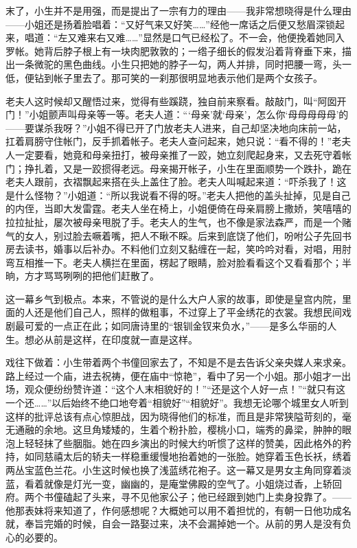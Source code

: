 \par 末了，小生并不是用强，而是提出了一宗有力的理由——我非常想晓得是什么理由——小姐还是扬着脸唱着：“又好气来又好笑……”经他一席话之后便又愁眉深锁起来，唱道：“左又难来右又难……”显然是口气已经松了。不一会，他便挽着她同入罗帐。她背后脖子根上有一块肉肥敦敦的；一绺子细长的假发沿着背脊垂下来，描出一条微驼的黑色曲线。小生只把她的脖子一勾，两人并排，同时把腰一弯，头一低，便钻到帐子里去了。那可笑的一刹那很明显地表示他们是两个女孩子。
\par 老夫人这时候却又醒悟过来，觉得有些蹊跷，独自前来察看。敲敲门，叫“阿囡开门！”小姐颤声叫母亲等一等。老夫人道：“‘母亲’就‘母亲’，怎么你‘母母母母母’的——要谋杀我呀？”小姐不得已开了门放老夫人进来，自己却坚决地向床前一站，扛着肩膀守住帐门，反手抓着帐子。老夫人查问起来，她只说：“看不得的！”老夫人一定要看，她竟和母亲扭打，被母亲推了一跤，她立刻爬起身来，又去死守着帐门；挣扎着，又是一跤掼得老远。母亲揭开帐子，小生在里面顺势一个跌扑，跪在老夫人跟前，衣褶飘起来搭在头上盖住了脸。老夫人叫喊起来道：“吓杀我了！这是什么怪物？”小姐道：“所以我说看不得的呀。”老夫人把他的盖头扯掉，见是自己的内侄，当即大发雷霆。老夫人坐在椅上，小姐便倚在母亲肩膀上撒娇，笑嘻嘻的拉拉扯扯，屡次被母亲甩脱了手。老夫人的生气，也不像是家法森严，而是一个赌气的女人，别过脸去噘着嘴，把人不瞅不睬。后来到底饶了他们，吩咐公子先回书房去读书，婚事以后补办。不料他们立刻又黏缠在一起，笑吟吟对看，对唱，用肘弯互相推一下。老夫人横拦在里面，楞起了眼睛，脸对脸看看这个又看看那个；半晌，方才骂骂咧咧的把他们赶散了。
\par 这一幕乡气到极点。本来，不管说的是什么大户人家的故事，即使是皇宫内院，里面的人还是他们自己人，照样的做粗事，不过穿上了平金绣花的衣裳。我想民间戏剧最可爱的一点正在此；如同唐诗里的“银钏金钗来负水，”——是多么华丽的人生。想必从前是这样，在印度就一直是这样。
\par 戏往下做着：小生带着两个书僮回家去了，不知是不是去告诉父亲央媒人来求亲。路上经过一个庙，进去祝祷，便在庙中“惊艳”，看中了另一个小姐。那小姐才一出场，观众便纷纷赞许道：“这个人末相貌好的！”“还是这个人好一点！”“就只有这一个还……”以后始终不绝口地夸着“相貌好”“相貌好”。我想无论哪个城里女人听到这样的批评总该有点心惊胆战，因为晓得他们的标准，而且是非常狭隘苛刻的，毫无通融的余地。这旦角矮矮的，生着个粉扑脸，樱桃小口，端秀的鼻梁，肿肿的眼泡上轻轻抹了些胭脂。她在四乡演出的时候大约听惯了这样的赞美，因此格外的矜持，如同慈禧太后的轿夫一样稳重缓慢地抬着她的一张脸。她穿着玉色长袄，绣着两丛宝蓝色兰花。小生这时候也换了浅蓝绣花袍子。这一幕又是男女主角同穿着淡蓝，看着就像是灯光一变，幽幽的，是庵堂佛殿的空气了。小姐烧过香，上轿回府。两个书僮磕起了头来，寻不见他家公子；他已经跟到她门上卖身投靠了。——他那表妹将来知道了，作何感想呢？大概她可以用不着担忧的，有朝一日他功成名就，奉旨完婚的时候，自会一路娶过来，决不会漏掉她一个。从前的男人是没有负心的必要的。
